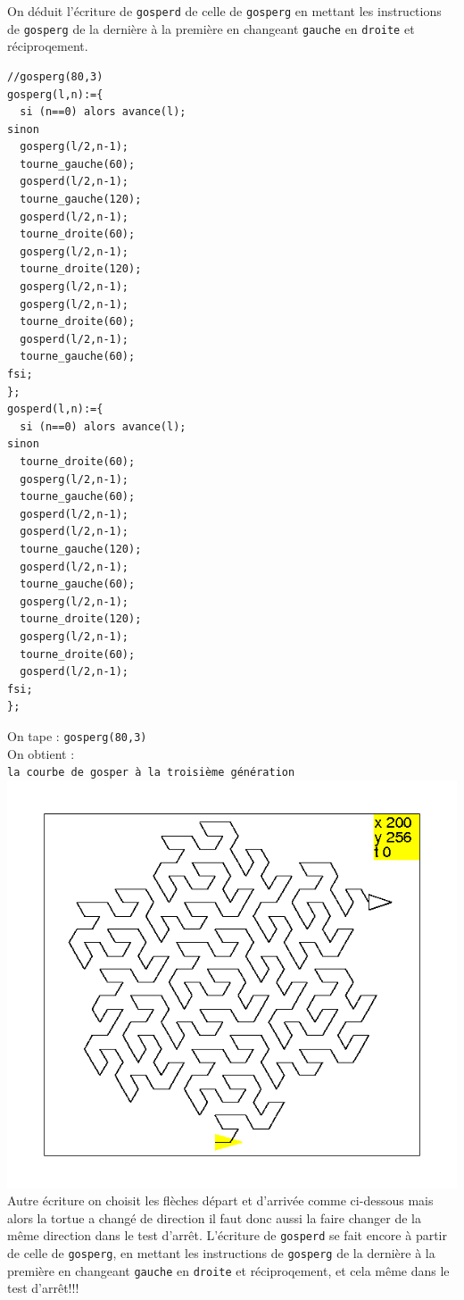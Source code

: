 \documentclass[a4paper,11pt]{book}
\begin{document}
On d\'eduit l'\'ecriture de {\tt gosperd} de celle de {\tt gosperg} en mettant 
les instructions de {\tt gosperg} de la derni\`ere \`a la premi\`ere en 
changeant {\tt gauche} en {\tt droite} et r\'eciproqement.
\begin{verbatim}
//gosperg(80,3)
gosperg(l,n):={
  si (n==0) alors avance(l);
sinon
  gosperg(l/2,n-1);
  tourne_gauche(60);
  gosperd(l/2,n-1);
  tourne_gauche(120);
  gosperd(l/2,n-1);
  tourne_droite(60);
  gosperg(l/2,n-1);
  tourne_droite(120);
  gosperg(l/2,n-1);
  gosperg(l/2,n-1);
  tourne_droite(60);
  gosperd(l/2,n-1);
  tourne_gauche(60);
fsi;
};
gosperd(l,n):={
  si (n==0) alors avance(l);
sinon
  tourne_droite(60);
  gosperg(l/2,n-1);
  tourne_gauche(60);
  gosperd(l/2,n-1);
  gosperd(l/2,n-1);
  tourne_gauche(120);
  gosperd(l/2,n-1);
  tourne_gauche(60);
  gosperg(l/2,n-1);
  tourne_droite(120);
  gosperg(l/2,n-1);
  tourne_droite(60);
  gosperd(l/2,n-1);
fsi;
};
\end{verbatim}
On tape :
{\tt gosperg(80,3)}\\
On obtient :\\
{\tt la courbe de gosper \`a la troisi\`eme g\'en\'eration}\\
 \includegraphics[width=\textwidth]{tortgosp}\\
Autre \'ecriture on choisit les fl\`eches d\'epart et d'arriv\'ee comme 
ci-dessous mais alors la tortue a chang\'e de direction il faut donc aussi la 
faire changer de la m\^eme direction dans le test d'arr\^et. L'\'ecriture de 
{\tt gosperd} se fait encore \`a partir de celle de {\tt gosperg}, en mettant 
les instructions de {\tt gosperg} de la derni\`ere \`a la premi\`ere en 
changeant {\tt gauche} en {\tt droite} et r\'eciproqement, et cela m\^eme dans 
le test d'arr\^et!!!
\end{document}
